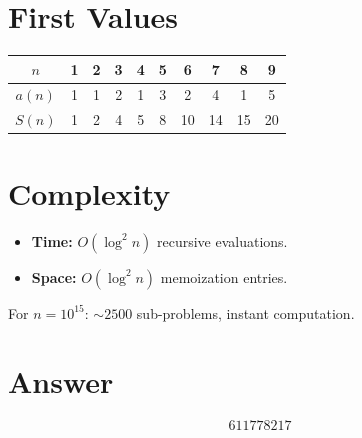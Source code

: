 \documentclass[11pt]{article}
\begin{document}
\section{First Values}

\begin{center}
\begin{tabular}{cccccccccc}
\toprule
$n$ & 1 & 2 & 3 & 4 & 5 & 6 & 7 & 8 & 9 \\
\midrule
$a(n)$ & 1 & 1 & 2 & 1 & 3 & 2 & 4 & 1 & 5 \\
$S(n)$ & 1 & 2 & 4 & 5 & 8 & 10 & 14 & 15 & 20 \\
\bottomrule
\end{tabular}
\end{center}

\section{Complexity}

\begin{itemize}
\item \textbf{Time:} $O(\log^2 n)$ recursive evaluations.
\item \textbf{Space:} $O(\log^2 n)$ memoization entries.
\end{itemize}

For $n = 10^{15}$: $\sim 2500$ sub-problems, instant computation.

\section{Answer}

\[
\boxed{611778217}
\]
\end{document}
